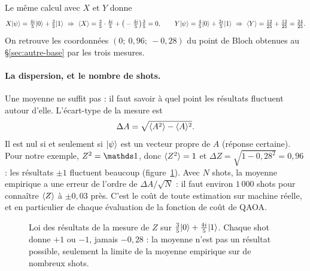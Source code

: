 Le même calcul avec $X$ et $Y$ donne
\[
X\ket\psi=\tfrac{4i}5\ket0+\tfrac35\ket1\ \Rightarrow\ \expval X=\tfrac35\cdot\tfrac{4i}5+\big(-\tfrac{4i}5\big)\tfrac35=0,\qquad
Y\ket\psi=\tfrac45\ket0+\tfrac{3i}5\ket1\ \Rightarrow\ \expval Y=\tfrac{12}{25}+\tfrac{12}{25}=\tfrac{24}{25}.
\]
On retrouve les coordonnées $(0;\ 0{,}96;\ -0{,}28)$ du point de Bloch obtenues au §\ref{sec:autre-base} par les trois mesures.

\paragraph{La dispersion, et le nombre de shots.} Une moyenne ne suffit pas : il faut savoir à quel point les résultats fluctuent autour d'elle. L'écart-type de la mesure est
\[
\Delta A=\sqrt{\langle A^2\rangle-\langle A\rangle^2}.
\]
Il est nul si et seulement si $\lvert \psi\rangle$ est un vecteur propre de $A$ (réponse certaine). Pour notre exemple, $Z^2=\Id$, donc $\langle Z^2\rangle=1$ et $\Delta Z=\sqrt{1-0{,}28^2}=0{,}96$ : les résultats $\pm1$ fluctuent beaucoup (figure~\ref{fig:histo-Z}). Avec $N$ shots, la moyenne empirique a une erreur de l'ordre de $\Delta A/\sqrt N$ : il faut environ $1\,000$ shots pour connaître $\langle Z\rangle$ à $\pm0{,}03$ près. C'est le coût de toute estimation sur machine réelle, et en particulier de chaque évaluation de la fonction de coût de QAOA.

\begin{figure}[htbp]
\centering
{}
\caption{Loi des résultats de la mesure de $Z$ sur $\tfrac35\lvert 0\rangle+\tfrac{4i}5\lvert 1\rangle$. Chaque shot donne $+1$ ou $-1$, jamais $-0{,}28$ : la moyenne n'est pas un résultat possible, seulement la limite de la moyenne empirique sur de nombreux shots.}\label{fig:histo-Z}
\end{figure}

